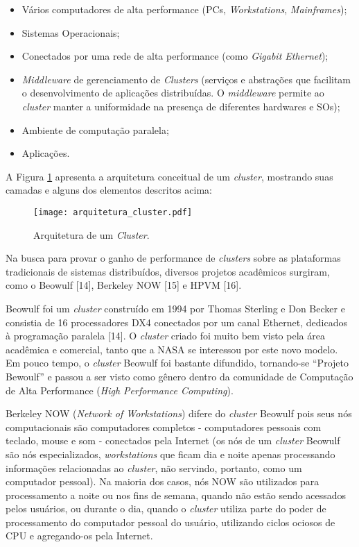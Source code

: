 \begin{itemize}
    \item Vários computadores de alta performance (PCs, \textit{Workstations}, \textit{Mainframes});
    \item Sistemas Operacionais;
    \item Conectados por uma rede de alta performance (como \textit{Gigabit Ethernet});
    \item \textit{Middleware} de gerenciamento de \textit{Clusters} (serviços e abstrações que facilitam o desenvolvimento de aplicações distribuídas. O \textit{middleware} permite ao \textit{cluster} manter a uniformidade na presença de diferentes hardwares e SOs);
    \item Ambiente de computação paralela;
    \item Aplicações.
\end{itemize}

A Figura \ref{fig:cluster_architecture} apresenta a arquitetura conceitual de um \textit{cluster}, mostrando suas camadas e alguns dos elementos descritos acima:

\begin{figure}[H]
	\centering
	\texttt{[image: arquitetura\_cluster.pdf]}
	\caption{Arquitetura de um \textit{Cluster}.}
	\label{fig:cluster_architecture}
\end{figure}

Na busca para provar o ganho de performance de \textit{clusters} sobre as plataformas tradicionais de sistemas distribuídos, diversos projetos acadêmicos surgiram, como o Beowulf [14], Berkeley NOW [15] e HPVM [16].

Beowulf foi um \textit{cluster} construído em 1994 por Thomas Sterling e Don Becker e consistia de 16 processadores DX4 conectados por um canal Ethernet, dedicados à programação paralela [14]. O \textit{cluster} criado foi muito bem visto pela área acadêmica e comercial, tanto que a NASA se interessou por este novo modelo. Em pouco tempo, o \textit{cluster} Beowulf foi bastante difundido, tornando-se “Projeto Bewoulf” e passou a ser visto como gênero dentro da comunidade de Computação de Alta Performance (\textit{High Performance Computing}).

Berkeley NOW (\textit{Network of Workstations}) difere do \textit{cluster} Beowulf pois seus nós computacionais são computadores completos - computadores pessoais com teclado, mouse e som - conectados pela Internet (os nós de um \textit{cluster} Beowulf são nós especializados, \textit{workstations} que ficam dia e noite apenas processando informações relacionadas ao \textit{cluster}, não servindo, portanto, como um computador pessoal). Na maioria dos casos, nós NOW são utilizados para processamento a noite ou nos fins de semana, quando não estão sendo acessados pelos usuários, ou durante o dia, quando o \textit{cluster} utiliza parte do poder de processamento do computador pessoal do usuário, utilizando ciclos ociosos de CPU e agregando-os pela Internet. 

